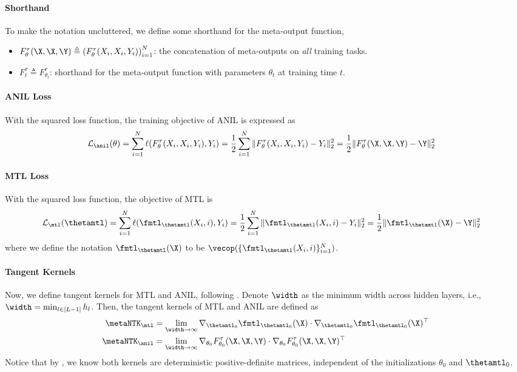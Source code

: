 \documentclass{article}
\begin{document}
\paragraph{Shorthand} To make the notation uncluttered, we define some shorthand for the meta-output function,
    \begin{itemize}
        \item $F^\tau_\theta(\X,\X,\Y) \triangleq \left(F^\tau_\theta(X_i,X_i,Y_i)\right)_{i=1}^N$: the concatenation of meta-outputs on \textit{all} training tasks. 
        \item $F^\tau_t \triangleq F^\tau_{\theta_t}$: shorthand for the meta-output function with parameters $\theta_t$ at training time $t$.
    \end{itemize}

\paragraph{ANIL Loss} 
With the squared loss function, the training objective of ANIL is expressed as
\begin{align} \label{eq:MAML-obj}
\mathcal L_\anil(\theta) &= \sum_{i=1}^N \ell (F^\tau_\theta(X_i,X_i,Y_i), Y_i) =\frac{1}{2}\sum_{i=1}^N\|F^\tau_\theta(X_i,X_i,Y_i)-Y_i\|_2^2
=\frac{1}{2}\|F^\tau_\theta(\X,\X,\Y)-\Y\|_2^2 
\end{align}
\paragraph{MTL Loss} 
With the squared loss function, the objective of MTL is
\begin{align}
    \mathcal L_\mtl (\thetamtl) &= \sum_{i=1}^N \ell (\fmtl_\thetamtl(X_i,i), Y_i)
    =\frac{1}{2}\sum_{i=1}^N\|\fmtl_\thetamtl(X_i,i)-Y_i\|_2^2 
    =\frac{1}{2}\|\fmtl_\thetamtl(\X)-\Y\|_2^2 
\end{align}
where we define the notation $\fmtl_\thetamtl(\X)$ to be $\vecop(\{\fmtl_\thetamtl(X_i, i)\}_{i=1}^N)$.
\paragraph{Tangent Kernels} Now, we define tangent kernels for MTL and ANIL, following \citet{meta-ntk}. Denote $\width$ as the minimum width across hidden layers, i.e., $\width = \min_{l\in[L-1]} h_l$. Then, the tangent kernels of MTL and ANIL are defined as
\begin{align}
        \metaNTK_\mtl  &= \lim_{\width \rightarrow \infty} \nabla_{\thetamtl_0} \fmtl_{\thetamtl_0}(\X) \cdot  \nabla_{\thetamtl_0} \fmtl_{\thetamtl_0}(\X)^\top\\
        \metaNTK_\anil  &= \lim_{\width\rightarrow \infty}\nabla_{\theta_0} F^\tau_{\theta_0}(\X,\X,\Y) \cdot  \nabla_{\theta_0} F^\tau_{\theta_0}(\X,\X,\Y)^\top
\end{align}
Notice that by \citet{meta-ntk}, we know both kernels are deterministic positive-definite matrices, independent of the initializations $\theta_0$ and $\thetamtl_0$.
\end{document}
